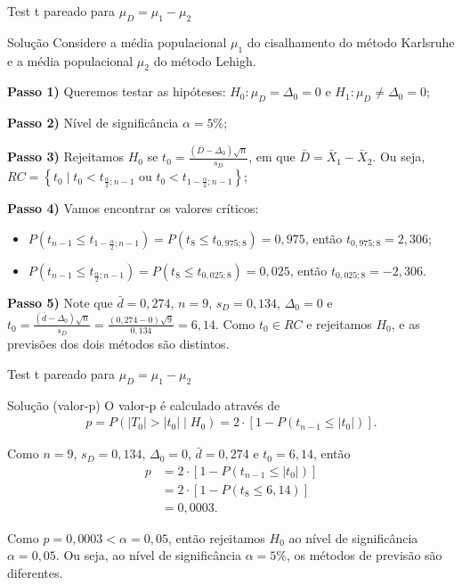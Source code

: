 \documentclass[9pt]{beamer}
\begin{document}
\begin{frame}{Test t pareado para $\mu_D = \mu_1 - \mu_2$}

\begin{block}{Solução}
	Considere a média populacional  $\mu_1$ do cisalhamento do método Karlsruhe e a média populacional $\mu_2$ do método Lehigh.
	
	\textbf{Passo 1)} Queremos testar as hipóteses: $H_0: \mu_D = \Delta_0= 0$ e $H_1: \mu_D \neq \Delta_0= 0$;
	
	\textbf{Passo 2)} Nível de significância $\alpha=5\%$;
	
	\textbf{Passo 3)} Rejeitamos $H_0$ se $t_0 = \frac{(\bar{D} - \Delta_0) \sqrt{n}}{s_D}$, em que $\bar{D} = \bar{X}_1 - \bar{X}_2$. Ou seja, $RC = \left\{ t_0 \mid t_0 < t_{\frac{\alpha}{2}; n-1} \mbox{ ou } t_0 < t_{1-\frac{\alpha}{2}; n-1} \right\}$;
	
	\textbf{Passo 4)} Vamos encontrar os valores críticos:
	\begin{itemize}
		\item $P(t_{n-1} \leq t_{1-\frac{\alpha}{2}; n-1}) = P(t_{8} \leq t_{0,975; 8}) = 0,975$, então $t_{0,975; 8} = 2,306$;
		\item $P(t_{n-1} \leq t_{\frac{\alpha}{2}; n-1}) = P(t_{8} \leq t_{0,025; 8}) = 0,025$, então $t_{0,025; 8} = -2,306$.
	\end{itemize}

	\textbf{Passo 5)} Note que $\bar{d} = 0,274$, $n=9$, $s_D = 0,134$, $\Delta_0=0$ e $t_0 = \frac{(\bar{d} - \Delta_0)\sqrt{n}}{s_D} = \frac{(0,274 - 0)\sqrt{9}}{0,134} = 6,14$. Como $t_0 \in RC$ e rejeitamos $H_0$, e as previsões dos dois métodos são distintos.
\end{block}

\end{frame}

\begin{frame}{Test t pareado para $\mu_D = \mu_1 - \mu_2$}

\begin{block}{Solução (valor-p)}
	O valor-p é calculado através de
	\begin{align*}
		p = P \left( \lvert T_0 \rvert > \lvert t_0 \rvert \mid H_0 \right) = 2 \cdot \left[1 - P \left( t_{n-1}  \leq \lvert t_0 \rvert  \right)\right].
	\end{align*}
	
	Como $n=9$, $s_D = 0,134$, $\Delta_0 = 0$, $\bar{d} = 0,274$ e $t_0 = 6,14$, então
	\begin{align*}
		p &=2 \cdot \left[1 - P \left(t_{n-1} \leq  \lvert t_0 \rvert \right)\right]\\
		&= 2 \cdot \left[1 - P \left(t_{8} \leq   6,14  \right)\right]\\
		&= 0,0003.
	\end{align*}
	
	Como $p=0,0003 < \alpha = 0,05$, então rejeitamos $H_0$ ao nível de significância $\alpha=0,05$. Ou seja, ao nível de significância $\alpha=5\%$, os métodos de previsão são diferentes.
\end{block}

\end{frame}
\end{document}
